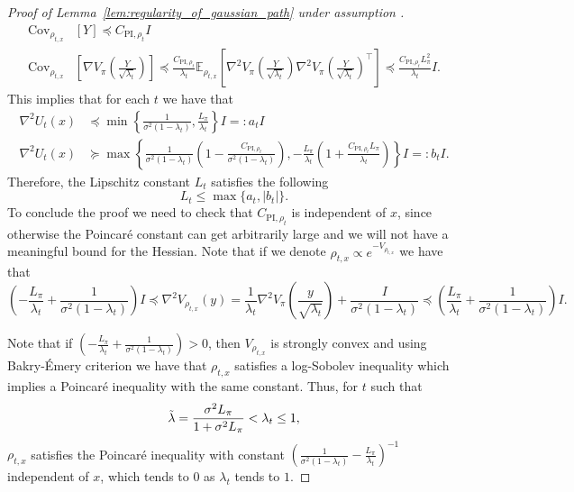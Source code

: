 \begin{proof}[Proof of Lemma~\ref{lem:regularity_of_gaussian_path} under assumption ]
\begin{align*}
    \text{Cov}_{\rho_{t, x}}&\left[Y\right]\preccurlyeq C_{\text{PI}, \rho_{t}} I\\
    \text{Cov}_{\rho_{t, x}}&\left[\nabla V_\pi\left(\frac{Y}{\sqrt{\lambda_t}}\right)\right]\preccurlyeq \frac{C_{\text{PI}, \rho_t}}{\lambda_t} \mathbb{E}_{\rho_{t, x}}\left[\nabla^2 V_\pi\left(\frac{Y}{\sqrt{\lambda_t}}\right)\nabla^2 V_\pi\left(\frac{Y}{\sqrt{\lambda_t}}\right)^{\intercal}\right]\preccurlyeq \frac{C_{\text{PI}, \rho_t} L_\pi^2}{\lambda_t} I.
\end{align*}
This implies that for each $t$ we have that 
\begin{align}
    \nabla^2 U_t(x) &\preccurlyeq \min\left\{\frac{1}{\sigma^2(1-\lambda_t)}, \frac{L_\pi}{\lambda_t}\right\} I =: a_t I \label{eq:hessian_final_bound_1}\\
    \nabla^2 U_t(x) &\succcurlyeq \max\left\{\frac{1}{\sigma^2(1-\lambda_t)}\left(1 - \frac{C_{\text{PI}, \rho_t}}{\sigma^2(1-\lambda_t)}\right), -\frac{L_\pi}{\lambda_t}\left(1 + \frac{C_{\text{PI}, \rho_t} L_\pi}{\lambda_t}\right)\right\} I =: b_t I.\label{eq:hessian_final_bound_2}
\end{align}
Therefore, the Lipschitz constant $L_t$ satisfies the following
\begin{equation}\label{eq:lipschitzness_constant_moving_target}
    L_t \leq \max\{a_t, \vert b_t\vert \}.
\end{equation}
To conclude the proof we need to check that $C_{\text{PI}, \rho_t}$ is independent of $x$, since otherwise the Poincaré constant can get arbitrarily large and we will not have a meaningful bound for the Hessian.
Note that if we denote $\rho_{t, x}\propto e^{-V_{\rho_{t, x}}}$ we have that 
\begin{equation}\label{eq:hessian_bound_joint_1}
    \left(-\frac{L_\pi}{\lambda_t} + \frac{1}{\sigma^2(1-\lambda_t)}\right) I\preccurlyeq\nabla^2 V_{\rho_{t, x}}(y) = \frac{1}{\lambda_t} \nabla^2 V_{\pi}\left(\frac{y}{\sqrt{\lambda_t}}\right) + \frac{I}{\sigma^2(1-\lambda_t)}\preccurlyeq \left(\frac{L_\pi}{\lambda_t} + \frac{1}{\sigma^2(1-\lambda_t)}\right) I.
\end{equation} 

Note that if $\left(-\frac{L_\pi}{\lambda_t}+\frac{1}{\sigma^2(1-\lambda_t)}\right)>0$, then $V_{\rho_{t, x}}$ is strongly convex and using Bakry-Émery criterion \citep{bakry_emery} we have that $\rho_{t, x}$ satisfies a log-Sobolev inequality which implies a Poincaré inequality with the same constant. Thus, for $t$ such that 
\begin{equation*}
    \Tilde{\lambda} = \frac{\sigma^2 L_\pi}{1+\sigma^2L_\pi} < \lambda_t \leq 1,
\end{equation*}
$\rho_{t, x}$ satisfies the Poincaré inequality with constant $\left(\frac{1}{\sigma^2(1-\lambda_t)}-\frac{L_\pi}{\lambda_t}\right)^{-1}$ independent of $x$, which tends to $0$ as $\lambda_t$ tends to $1$. 



\end{proof}
